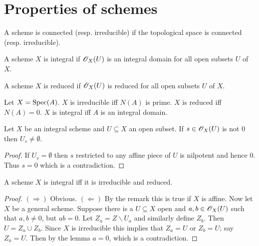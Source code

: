 \documentclass{memoir}
\begin{document}
\section{Properties of schemes}
\begin{definition}
    A scheme is connected (resp. irreducible) if the topological space is connected (resp. irreducible).
\end{definition}
\begin{definition}
    A scheme $X$ is integral if $\mathscr{O}_X(U)$ is an integral domain for all open subsets $U$ of $X$.
\end{definition}
\begin{definition}
    A scheme $X$ is reduced if $\mathscr{O}_X(U)$ is reduced for all open subsets $U$ of $X$.
\end{definition}
\begin{remark}
    Let $X = \operatorname{Spec}(A)$.
    $X$ is irreducible iff $N(A)$ is prime.
    $X$ is reduced iff $N(A)=0$.
    $X$ is integral iff $A$ is an integral domain.
\end{remark}
\begin{lemma}
    Let $X$ be an integral scheme and $U\subseteq X$ an open subset.
    If $s\in \mathscr{O}_X(U)$ is not $0$ then $U_s \ne \emptyset$.
\end{lemma}
\begin{proof}
    If $U_s = \emptyset$ then $s$ restricted to any affine piece of $U$ is nilpotent and hence $0$.
    Thus $s = 0$ which is a contradiction.
\end{proof}
\begin{proposition}
    A scheme $X$ is integral iff it is irreducible and reduced.
\end{proposition}
\begin{proof}
    $(\Rightarrow)$ Obvious.
    $(\Leftarrow)$ By the remark this is true if $X$ is affine.
    Now let $X$ be a general scheme.
    Suppose there is a $U\subseteq X$ open and $a,b\in \mathscr{O}_X(U)$ such that $a,b\ne 0$, but $ab=0$.
    Let $Z_a = Z\backslash U_a$ and similarly define $Z_b$.
    Then $U = Z_a\cup Z_b$.
    Since $X$ is irreducible this implies that $Z_a = U$ or $Z_b = U$; say $Z_a = U$.
    Then by the lemma $a=0$, which is a contradiction.
\end{proof}
\end{document}
